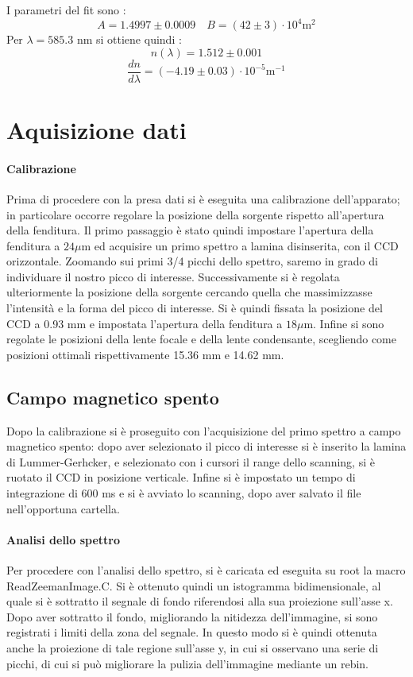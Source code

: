 \documentclass{article}
\begin{document}
	I parametri del fit sono :
	$$ A= 1.4997 \pm 0.0009 \quad B= (42 \pm 3 )\cdot 10^4 \text{m}^2$$
	Per $\lambda= 585.3$ nm si ottiene quindi :
	$$n(\lambda)= 1.512 \pm 0.001  $$
	$$  \frac{dn}{d\lambda} = (-4.19 \pm 0.03 )\cdot 10^{-5} \text{m}^{-1}$$

	\section*{Aquisizione dati}
	
	\paragraph{Calibrazione}
	Prima di procedere con la presa dati si è eseguita una calibrazione 
	dell'apparato; in particolare occorre regolare la posizione 
	della sorgente rispetto all'apertura della fenditura.
	Il primo passaggio è stato quindi impostare l'apertura della fenditura 
	a $24 \mu$m ed acquisire un primo spettro a lamina disinserita, con il 
	CCD orizzontale. Zoomando sui primi 3/4 picchi dello spettro, saremo
	in grado di individuare il nostro picco di interesse.
	Successivamente si è regolata ulteriormente la posizione della sorgente 
	cercando quella che massimizzasse l'intensità e la forma del picco di 
	interesse.
	Si è quindi fissata la posizione del CCD a 0.93 mm e impostata l'apertura 
	della fenditura a $18 \mu$m.
	Infine si sono regolate le posizioni della lente focale e della lente 
	condensante, scegliendo come posizioni ottimali rispettivamente 15.36 mm 
	e 14.62 mm.


	\subsection*{Campo magnetico spento}

	Dopo la calibrazione si è proseguito con l'acquisizione del primo 
	spettro a campo magnetico spento: dopo aver selezionato il picco di 
	interesse si è inserito la lamina di Lummer-Gerhcker, e selezionato 
	con i cursori il range dello scanning, si è ruotato il CCD
	in posizione verticale.
	Infine si è impostato un tempo di integrazione di 600 ms e si è avviato
	lo scanning, dopo aver salvato il file nell'opportuna cartella.


	\paragraph{Analisi dello spettro}
	Per procedere con l'analisi dello spettro, si è caricata ed eseguita su root la macro ReadZeemanImage.C. 
	Si è ottenuto quindi un istogramma bidimensionale, al quale si è sottratto il segnale di fondo riferendosi alla sua proiezione 
	sull’asse x.
	Dopo aver sottratto il fondo, migliorando la nitidezza dell'immagine, si sono registrati i limiti della zona del segnale. 
	In questo modo si è quindi ottenuta anche la proiezione di tale regione sull’asse y, in cui si osservano una serie di picchi, 
	di cui si può migliorare la pulizia dell'immagine mediante un rebin.
\end{document}
